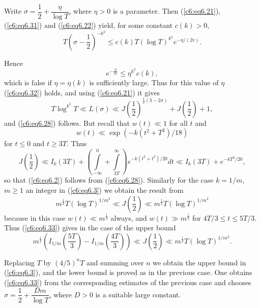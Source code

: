 Write $\sigma =\dfrac{1}{2} + \dfrac{\eta}{\log T}$, where $\eta >0$
is a parameter. Then (\ref{c6:eq6.21}), (\ref{c6:eq6.31}) and
(\ref{c6:eq6.22}) yield, for some constant $c(k) >0$, 
$$
T \left(\sigma -\frac{1}{2} \right)^{-k^2} \leq c(k) T (\log T)^{k^2}
e^{-\eta / (2v)}. 
$$

Hence\pageoriginale
$$
e^{-\frac{\eta}{2v}} \leq \eta^{k^2} c(k),
$$
which is false if $\eta = \eta(k)$ is sufficiently large. Thus for
this value of $\eta$ (\ref{c6:eq6.32}) holds, and using
(\ref{c6:eq6.21}) it gives 
$$ 
T \log^{k^2} T \ll L(\sigma) \ll J \left(\frac{1}{2}
\right)^{\frac{1}{2} (3-2\sigma)} + J \left(\frac{1}{2} \right) + 1, 
$$
and (\ref{c6:eq6.28}) follows. But recall that $w(t) \ll 1$ for all
$t$ and  
$$
w(t) \ll \exp (-k(t^2 + T^2)/18)
$$
for $t \leq 0$ and $t \geq 3T$. Thus
$$
J \left(\frac{1}{2} \right) \ll I_k(3T) +
\left(\int\limits^0_{-\infty} + \int\limits^{\infty}_{3T} \right)
e^{-k(t^2 + t^2)/20} dt \ll I_k(3T) + e^{-kT^2/20}, 
$$
so that (\ref{c6:eq6.2}) follows from (\ref{c6:eq6.28}). Similarly for
the case $k=1/m$, $m \geq 1$ an integer in (\ref{c6:eq6.3}) we obtain
the result from  
\begin{equation}
m^{\frac{1}{2}} T(\log T)^{1/m^2} \ll J \left(\frac{1}{2} \right) \ll
m^{\frac{1}{2}}  T  (\log T)^{1/m^2}\label{c6:eq6.33} 
\end{equation}
because in this case $w(t) \ll m^{\frac{1}{2}}$ always, and $w(t) \gg
m^{\frac{1}{2}}$ for $4 T /3 \leq t \leq 5T/3$. Thus (\ref{c6:eq6.33})
gives in the case of the upper bound 
$$ 
m^{\frac{1}{2}} \left(I_{1/m} \left(\frac{5T}{3} \right) - I_{1/m}
\left(\frac{4 T}{3} \right) \right) \ll J \left(\frac{1}{2} \right)
\ll m^{\frac{1}{2}} T (\log T)^{1/m^2}. 
$$

Replacing $T$ by $(4/5)^{n}T$ and summing over $n$ we obtain the upper
bound in (\ref{c6:eq6.3}), and the lower bound is proved as in the
previous case. One obtains (\ref{c6:eq6.33}) from the corresponding
estimates of the previous case and chooses $\sigma =\dfrac{1}{2} +
\dfrac{Dm}{\log T}$, where $D >0$ is a suitable large constant. 

